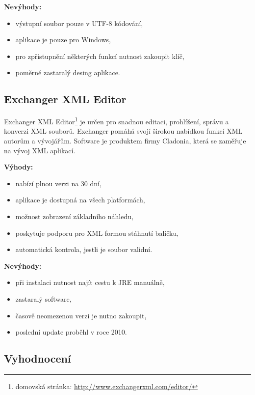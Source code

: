             \textbf{Nevýhody:}
                \begin{itemize}
                    \item výstupní soubor pouze v UTF-8 kódování,
                    \item aplikace je pouze pro Windows,
                    \item pro zpřístupnění některých funkcí nutnost zakoupit klíč,
                    \item poměrně zastaralý desing aplikace.
                \end{itemize}

        \subsection{Exchanger XML Editor}
            Exchanger XML Editor\footnote{domovská stránka: \url{http://www.exchangerxml.com/editor/}} je určen pro snadnou editaci, prohlížení, správu a konverzi XML souborů. Exchanger pomáhá svojí širokou nabídkou funkcí XML autorům a vývojářům.  Software je produktem firmy Cladonia, která se zaměřuje na vývoj XML aplikací. 
            
            \textbf{Výhody:}
                \begin{itemize}
                    \item nabízí plnou verzi na 30 dní,
                    \item aplikace je dostupná na všech platformách,
                    \item možnost zobrazení základního náhledu,
                    \item poskytuje podporu pro XML formou stáhnutí balíčku,
                    \item automatická kontrola, jestli je soubor validní.
                \end{itemize}
                
            \textbf{Nevýhody:}
                \begin{itemize}
                    \item při instalaci nutnost najít cestu k JRE manuálně,
                    \item zastaralý software,
                    \item časově neomezenou verzi je nutno zakoupit,
                    \item poslední update proběhl v roce 2010.
                \end{itemize}
        \subsection{Vyhodnocení}

